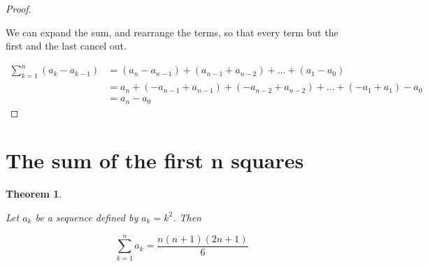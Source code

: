 \documentclass{article}
\newtheorem{theorem}{Theorem}
\begin{document}
\begin{proof}
\begin{flushleft}
We can expand the sum, and rearrange the terms, so that every term but the first and the last cancel out.
\end{flushleft}
\begin{align*}
\sum_{k=1}^{n} (a_{k} - a_{k-1}) &= (a_{n} - a_{n-1}) + (a_{n-1} + a_{n-2}) + ... + (a_{1} - a_{0}) \\
&= a_{n} + (-a_{n-1} + a_{n-1}) + (-a_{n-2} + a_{n-2}) + ... + (-a_{1} + a_{1}) - a_{0} \\
&= a_{n} - a_{0}
\end{align*}

\end{proof}

\section{The sum of the first n squares}

\begin{theorem}
\begin{flushleft}
Let $a_{k}$ be a sequence defined by $a_{k} = k^2$. Then
\end{flushleft}
\begin{equation*}
\sum_{k=1}^{n} a_{k} = \frac{n(n+1)(2n+1)}{6}
\end{equation*}
\end{theorem}
\end{document}
